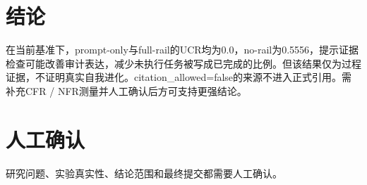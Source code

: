 \documentclass[UTF8]{ctexart}
\begin{document}
\section{结论}
在当前基准下，prompt-\allowbreak{}only与full-\allowbreak{}rail的UCR均为0.0，no-\allowbreak{}rail为0.5556，提示证据检查可能改善审计表达，减少未执行任务被写成已完成的比例。但该结果仅为过程证据，不证明真实自我进化。citation\_\allowbreak{}allowed=false的来源不进入正式引用。需补充CFR / NFR测量并人工确认后方可支持更强结论。
\section{人工确认}
研究问题、实验真实性、结论范围和最终提交都需要人工确认。
\end{document}
